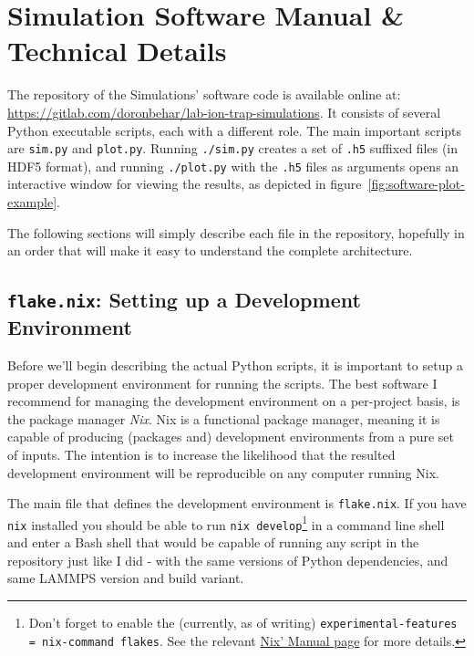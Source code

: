 \chapter{Simulation Software Manual \& Technical Details}

The repository of the Simulations' software code is available online at: \url{https://gitlab.com/doronbehar/lab-ion-trap-simulations}. It consists of several Python executable scripts, each with a different role. The main important scripts are \texttt{sim.py} and \texttt{plot.py}. Running \texttt{./sim.py} creates a set of \texttt{.h5} suffixed files (in HDF5\cite{HDF5} format), and running \texttt{./plot.py} with the \texttt{.h5} files as arguments opens an interactive window for viewing the results, as depicted in figure~\ref{fig:software-plot-example}.

The following sections will simply describe each file in the repository, hopefully in an order that will make it easy to understand the complete architecture.

\section{\texttt{flake.nix}: Setting up a Development Environment}

Before we'll begin describing the actual Python scripts, it is important to setup a proper development environment for running the scripts. The best software I recommend for managing the development environment on a per-project basis, is the package manager \textit{Nix}\cite{Nix}. Nix is a functional package manager\cite{NixThesis}, meaning it is capable of producing (packages and) development environments from a pure set of inputs. The intention is to increase the likelihood that the resulted development environment will be reproducible\cite{SoftwareReproducitilityThesis} on any computer running Nix.

The main file that defines the development environment is \texttt{flake.nix}. If you have \texttt{nix} installed you should be able to run \texttt{nix develop}\footnote{Don't forget to enable the (currently, as of writing) \texttt{experimental-features = nix-command flakes}. See the relevant \href{https://nix.dev/manual/nix/stable/contributing/experimental-features}{Nix' Manual page} for more details.} in a command line shell and enter a Bash shell that would be capable of running any script in the repository just like I did - with the same versions of Python dependencies, and same LAMMPS version and build variant.

